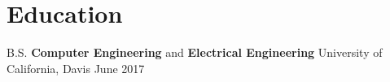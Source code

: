 \section{Education}
\begin{educationlist}
    \item
        {B.S.}
        {\textbf{Computer Engineering} and \textbf{Electrical Engineering}}
        {University of California, Davis}
        {June 2017}
\end{educationlist}

